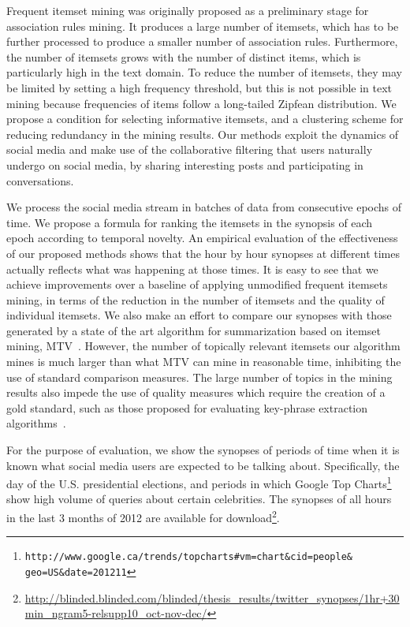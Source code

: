 \documentclass{sig-alternate}
\begin{document}
Frequent itemset mining was originally proposed as a preliminary stage for
association rules mining.
It produces a large number of itemsets, which
has to be further processed to 
produce a smaller number of association rules.
Furthermore, the number of itemsets grows with the number of
distinct items, which is particularly high in the text domain.
To reduce the number of itemsets, they may be limited by setting a high
frequency threshold, but this is not possible in text mining because
frequencies of items follow a long-tailed Zipfean distribution.
We propose a condition for selecting informative itemsets, 
and a clustering scheme for reducing redundancy in the mining results.
Our methods exploit the dynamics of social media 
and make use of the collaborative filtering
that users naturally undergo on social media, 
by sharing interesting posts and participating in conversations.


We process the social media stream in batches 
of data from consecutive epochs of time.
We propose a formula for ranking the itemsets
in the synopsis of each epoch according to temporal novelty.
An empirical evaluation of the effectiveness of our proposed methods
shows that the hour by hour synopses at different times 
actually reflects what was happening at those times. 
It is easy to see that
we achieve improvements over a baseline
of applying unmodified frequent itemsets mining, 
in terms of the reduction in the number of itemsets 
and the quality of individual itemsets.
We also make an effort to compare our synopses 
with those generated by a state of the art algorithm 
for summarization based on itemset mining, MTV~\cite{mampaey2011tell}.
However, the number of topically relevant itemsets our algorithm mines 
is much larger than what MTV can mine in reasonable time,
inhibiting the use of standard comparison measures.
The large number of topics in the mining results 
also impede the use of quality measures which require 
the creation of a gold standard, 
such as those proposed for evaluating
key-phrase extraction algorithms~\cite{Zhao:2011:TKE:2002472.2002521}.

For the purpose of evaluation, we show the synopses 
of periods of time when it is known what 
social media users are expected to be talking about.
Specifically, the day of the U.S. presidential elections,
and periods in which Google Top Charts\footnote{\scriptsize \texttt{http://www.google.ca/trends/topcharts\#vm=chart\&cid=people\&\\geo=US\&date=201211}}
show high volume of queries about certain celebrities.
The synopses of all hours in the last 3 months of 2012
are available for download\footnote{\scriptsize \url{http://blinded.blinded.com/blinded/thesis_results/twitter_synopses/1hr+30min_ngram5-relsupp10_oct-nov-dec/}}. 
\end{document}
